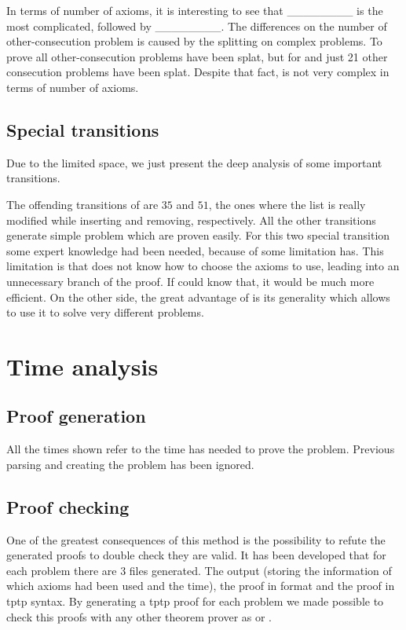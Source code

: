 In terms of number of axioms, it is interesting to see that \_\_\_\_\_\_\_\_ is the most complicated, followed by \_\_\_\_\_\_\_\_. 
%
The differences on the number of other-consecution problem is caused by the splitting on complex \spass problems. 
%
To prove \orderInv all other-consecution problems have been splat, but for \lockInv and \nextInv just 21 other consecution problems have been splat.
%
Despite that fact, \orderInv is not very complex in terms of number of axioms. 


\subsection{Special transitions}

Due to the limited space, we just present the deep analysis of some important transitions.

The offending transitions of \preserveInv are $35$ and $51$, the ones where the list is really modified while inserting and removing, respectively.
%
All the other transitions generate simple \spass problem which are proven easily.
%
For this two special transition some expert knowledge had been needed, because of some limitation \spass has.
%
This limitation is that \spass does not know how to choose the axioms to use, leading into an unnecessary branch of the proof. 
%
If \spass could know that, it would be much more efficient. 
%
On the other side, the great advantage of \spass is its generality which allows to use it to solve very different problems. 


\section{Time analysis}
\label{sec:timeanalysis}

\subsection{Proof generation}

All the times shown refer to the time \spass has needed to prove the problem. 
%
Previous parsing and creating the \spass problem has been ignored.



\subsection{Proof checking}

One of the greatest consequences of this method is the possibility to refute the generated proofs to double check they are valid.
%
It has been developed that for each \spass problem there are 3 files generated. The \spass output (storing the information of which axioms had been used and the time), the \spass proof in \spass format and the \spass proof in \gls{tptp} syntax.
%
By generating a tptp proof for each \spass problem we made possible to check this proofs with any other theorem prover as  or .

